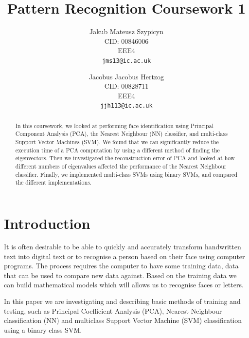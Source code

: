 \documentclass[10pt,twocolumn,letterpaper]{article}
\begin{document}
\title{Pattern Recognition Coursework 1}

\author{Jakub Mateusz Szypicyn\\
CID: 00846006\\
EEE4\\
{\tt\small jms13@ic.ac.uk}
\and
Jacobus Jacobus Hertzog\\
CID: 00828711\\
EEE4\\
{\tt\small jjh113@ic.ac.uk}
}

\maketitle

\begin{abstract}
\vspace{-4mm}
In this coursework, we looked at performing face identification using Principal Component Analysis (PCA), the Nearest Neighbour (NN) classifier, and multi-class Support Vector Machines (SVM). We found that we can significantly reduce the execution time of a  PCA computation by using a different method of finding the eigenvectors. Then we investigated the reconstruction error of PCA and looked at how different numbers of eigenvalues affected the performance of the Nearest Neighbour classifier. Finally, we implemented multi-class SVMs using binary SVMs, and compared the different implementations.
\end{abstract}
\vspace{-5mm}
\section{Introduction}

It is often desirable to be able to quickly and accurately transform handwritten text into digital text or to recognise a person based on their face using computer programs. The process requires the computer to have some training data, data that can be used to compare new data against. Based on the training data we can build mathematical models which will allows us to recognise faces or letters.

In this paper we are investigating and describing basic methods of training and testing, such as Principal Coefficient Analysis (PCA), Nearest Neighbour classification (NN) and multiclass Support Vector Machine (SVM) classification using a binary class SVM. 
\end{document}
